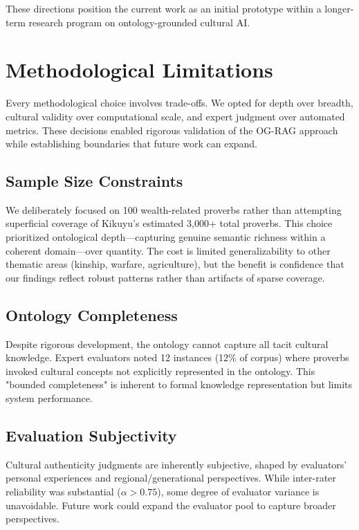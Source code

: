 These directions position the current work as an initial prototype within a longer-term research program on ontology-grounded cultural AI.

\section{Methodological Limitations}
\label{sec:methodological_limitations}

Every methodological choice involves trade-offs. We opted for depth over breadth, cultural validity over computational scale, and expert judgment over automated metrics. These decisions enabled rigorous validation of the OG-RAG approach while establishing boundaries that future work can expand.

\subsection{Sample Size Constraints}
\label{subsec:sample_limitations}

We deliberately focused on 100 wealth-related proverbs rather than attempting superficial coverage of Kikuyu's estimated 3,000+ total proverbs. This choice prioritized ontological depth—capturing genuine semantic richness within a coherent domain—over quantity. The cost is limited generalizability to other thematic areas (kinship, warfare, agriculture), but the benefit is confidence that our findings reflect robust patterns rather than artifacts of sparse coverage.

\subsection{Ontology Completeness}
\label{subsec:ontology_completeness}

Despite rigorous development, the ontology cannot capture all tacit cultural knowledge. Expert evaluators noted 12 instances (12\% of corpus) where proverbs invoked cultural concepts not explicitly represented in the ontology. This "bounded completeness" is inherent to formal knowledge representation but limits system performance.

\subsection{Evaluation Subjectivity}
\label{subsec:eval_subjectivity}

Cultural authenticity judgments are inherently subjective, shaped by evaluators' personal experiences and regional/generational perspectives. While inter-rater reliability was substantial ($\alpha > 0.75$), some degree of evaluator variance is unavoidable. Future work could expand the evaluator pool to capture broader perspectives.

